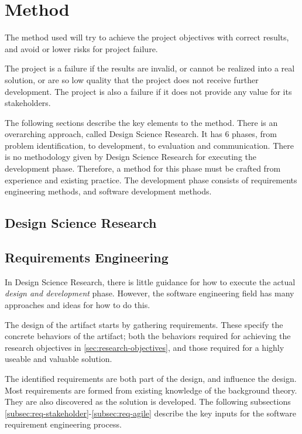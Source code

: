 \chapter{Method}\label{chap:method}

The method used will try to achieve the project objectives with correct results, and avoid or lower risks for project failure.


The project is a failure if the results are invalid, or cannot be realized into a real solution, or are so low quality that the project does not receive further development.
The project is also a failure if it does not provide any value for its stakeholders.


The following sections describe the key elements to the method.
There is an overarching approach, called Design Science Research.
It has 6 phases, from problem identification, to development, to evaluation and communication.
There is no methodology given by Design Science Research for executing the development phase.
Therefore, a method for this phase must be crafted from experience and existing practice.
The development phase consists of requirements engineering methods, and software development methods.


\section{Design Science Research}




\section{Requirements Engineering}

In Design Science Research, there is little guidance for how to execute the actual \textit{design and development} phase.
However, the software engineering field has many approaches and ideas for how to do this.


The design of the artifact starts by gathering requirements.
These specify the concrete behaviors of the artifact; both the behaviors required for achieving the research objectives in \cref{sec:research-objectives}, and those required for a highly useable and valuable solution.


The identified requirements are both part of the design, and influence the design.
Most requirements are formed from existing knowledge of the background theory.
They are also discovered as the solution is developed.
The following subsections \ref{subsec:req-stakeholder}-\ref{subsec:req-agile} describe the key inputs for the software requirement engineering process.


